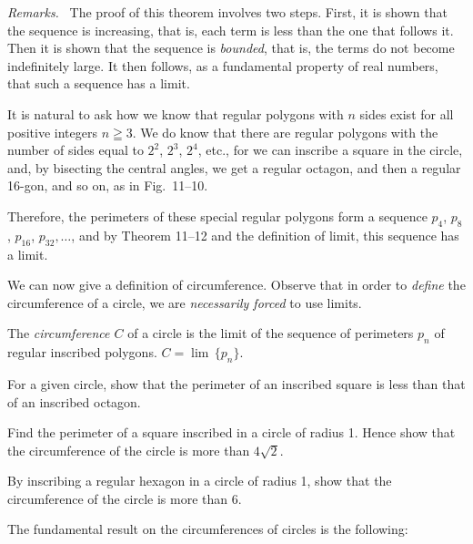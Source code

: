 \documentclass[11pt]{book}
\theoremstyle{XIplainnote}
\theoremstyle{bkplain}
\newenvironment{XIremarks}{\par\medskip\noindent\emph{Remarks.}\ }%
  {\par\medskip}
\newcommand{\XIgeqq}{\geqq}
\begin{document}
\begin{XIremarks}
The proof of this theorem involves two steps. First, it is shown that the
sequence is increasing, that is, each term is less than the one that follows
it. Then it is shown that the sequence is \emph{bounded}, that is, the terms do
not become indefinitely large. It then follows, as a fundamental property of
real numbers, that such a sequence has a limit.
\end{XIremarks}

It is natural to ask how we know that regular polygons with $n$ sides exist for
all positive integers $n \XIgeqq 3$. We do know that there are regular polygons
with the number of sides equal to $2^2$, $2^3$, $2^4$, etc., for we can
inscribe a square in the circle, and, by bisecting the central angles, we get a
regular octagon, and then a regular 16-gon, and so on, as in Fig.~11--10.

\FIGXITEN

Therefore, the perimeters of these special regular polygons form a sequence
$p_4$, $p_8$, $p_{16}$, $p_{32},\ldots$, and by Theorem 11--12 and the
definition of limit, this sequence has a limit.

We can now give a definition of circumference. Observe that in order to
\emph{define} the circumference of a circle, we are \emph{necessarily forced}
to use limits.

\begin{definition}
The \emph{circumference $C$} of a circle is the limit of the sequence of
perimeters $p_n$ of regular inscribed polygons. $C = \lim\,\{p_n\}$.
\end{definition}

\begin{exercisecols}
\begin{exlist}
\item For a given circle, show that the perimeter of an inscribed square is
      less than that of an inscribed octagon.
\item Find the perimeter of a square inscribed in a circle of radius 1. Hence
      show that the circumference of the circle is more than $4\sqrt{2}$.
\item By inscribing a regular hexagon in a circle of radius 1, show that the
      circumference of the circle is more than 6.
\end{exlist}
\end{exercisecols}

The fundamental result on the circumferences of circles is the following:
\end{document}
